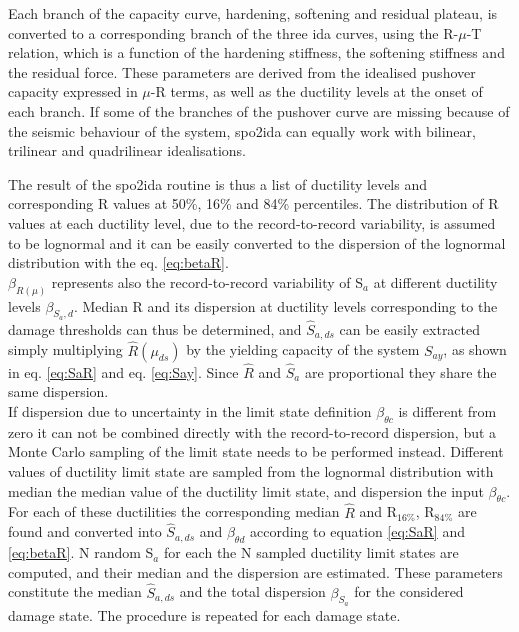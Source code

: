 Each branch of the capacity curve, hardening, softening and residual plateau, is converted to a corresponding branch of the three ida curves, using the R-$\mu$-T relation, which is a function of the hardening stiffness, the softening stiffness and the residual force. These parameters are derived from the idealised pushover capacity expressed in $\mu$-R terms, as well as the ductility levels at the onset of each branch. If some of the branches of the pushover curve are missing because of the seismic behaviour of the system, spo2ida can equally work with bilinear, trilinear and quadrilinear idealisations.

The result of the spo2ida routine is thus a list of ductility levels and corresponding R values at 50\%, 16\% and 84\% percentiles. The distribution of R values at each ductility level, due to the record-to-record variability, is assumed to be lognormal and it can be easily converted to the dispersion of the lognormal distribution with the eq. \ref{eq:betaR}. \\
$\beta_{R(\mu)}$ represents also the record-to-record variability of S$_a$ at different ductility levels $\beta_{S_a, d}$. Median R and its dispersion at ductility levels corresponding to the damage thresholds can thus be determined, and $\hat{S}_{a,ds}$ can be easily extracted simply multiplying $\hat{R}(\mu_{ds})$ by the yielding capacity of the system $S_{ay}$, as shown in eq. \ref{eq:SaR} and eq. \ref{eq:Say}. Since $\hat{R}$ and $\hat{S}_{a}$ are proportional they share the same dispersion.\\

If dispersion due to uncertainty in the limit state definition $\beta_{\theta c}$ is different from zero it can not be combined directly with the record-to-record dispersion, but a Monte Carlo sampling of the limit state needs to be performed instead. Different values of ductility limit state are sampled from the  lognormal distribution with median the median value of the ductility limit state, and dispersion the input $\beta_{\theta c}$. For each of these ductilities the corresponding median $\hat{R}$ and R$_{16\%}$, R$_{84\%}$ are found and converted into $\hat{S}_{a,ds}$ and $\beta_{\theta d}$ according to equation \ref{eq:SaR} and \ref{eq:betaR}. N random S$_a$ for each the N sampled ductility limit states are computed, and their median and the dispersion are estimated. These parameters constitute the median $\hat{S}_{a,ds}$ and the total dispersion $\beta_{S_a}$ for the considered damage state. The procedure is repeated for each damage state.\\

